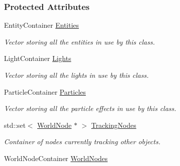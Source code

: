 \subsubsection*{Protected Attributes}
\begin{DoxyCompactItemize}
\item 
\hypertarget{classMezzanine_1_1SceneManager_af76f840b982cf140cebe9398b7caedb3}{
EntityContainer \hyperlink{classMezzanine_1_1SceneManager_af76f840b982cf140cebe9398b7caedb3}{Entities}}
\label{classMezzanine_1_1SceneManager_af76f840b982cf140cebe9398b7caedb3}

\begin{DoxyCompactList}\small\item\em Vector storing all the entities in use by this class. \item\end{DoxyCompactList}\item 
\hypertarget{classMezzanine_1_1SceneManager_ad80ecee7efce608a526befc597b3d613}{
LightContainer \hyperlink{classMezzanine_1_1SceneManager_ad80ecee7efce608a526befc597b3d613}{Lights}}
\label{classMezzanine_1_1SceneManager_ad80ecee7efce608a526befc597b3d613}

\begin{DoxyCompactList}\small\item\em Vector storing all the lights in use by this class. \item\end{DoxyCompactList}\item 
\hypertarget{classMezzanine_1_1SceneManager_aacac613a9a842967e1383f5004f76a77}{
ParticleContainer \hyperlink{classMezzanine_1_1SceneManager_aacac613a9a842967e1383f5004f76a77}{Particles}}
\label{classMezzanine_1_1SceneManager_aacac613a9a842967e1383f5004f76a77}

\begin{DoxyCompactList}\small\item\em Vector storing all the particle effects in use by this class. \item\end{DoxyCompactList}\item 
\hypertarget{classMezzanine_1_1SceneManager_a19cb85bda03fce0115a62869b5e819a5}{
std::set$<$ \hyperlink{classMezzanine_1_1WorldNode}{WorldNode} $\ast$ $>$ \hyperlink{classMezzanine_1_1SceneManager_a19cb85bda03fce0115a62869b5e819a5}{TrackingNodes}}
\label{classMezzanine_1_1SceneManager_a19cb85bda03fce0115a62869b5e819a5}

\begin{DoxyCompactList}\small\item\em Container of nodes currently tracking other objects. \item\end{DoxyCompactList}\item 
\hypertarget{classMezzanine_1_1SceneManager_a7550a9ecf7060db5abef99d66c4ef757}{
WorldNodeContainer \hyperlink{classMezzanine_1_1SceneManager_a7550a9ecf7060db5abef99d66c4ef757}{WorldNodes}}
\label{classMezzanine_1_1SceneManager_a7550a9ecf7060db5abef99d66c4ef757}


\end{DoxyCompactItemize}
